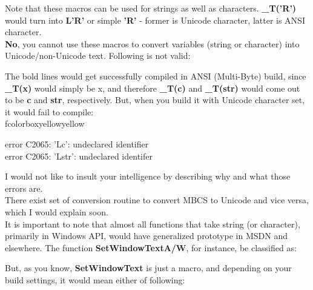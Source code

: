 	Note that these macros can be used for strings as well as characters. \textbf{\_T('R')} would turn into \textbf{L'R'} or simple \textbf{'R'} - former is Unicode character, latter is ANSI character.\\
	
	\textbf{No}, you cannot use these macros to convert variables (string or character) into Unicode/non-Unicode text. Following is not valid:\\
	
	
	The bold lines would get successfully compiled in ANSI (Multi-Byte) build, since \textbf{\_T(x)} would simply be x, and therefore \textbf{\_T(c)} and \textbf{\_T(str)} would come out to be \textbf{c} and \textbf{str}, respectively. But, when you build it with Unicode character set, it would fail to compile:\\
	
	fcolorbox{yellow}{yellow}{\parbox{0.9\linewidth}{error C2065: 'Lc': undeclared identifier\\ error C2065: 'Lstr': undeclared identifer}}
	
	I would not like to insult your intelligence by describing why and what those errors are.\\
	
	There exist set of conversion routine to convert MBCS to Unicode and vice versa, which I would explain soon.\\
	
	It is important to note that almost all functions that take string (or character), primarily in Windows API, would have generalized prototype in MSDN and elsewhere. The function \textbf{SetWindowTextA/W}, for instance, be classified as:\\
	
	
	
	But, as you know, \textbf{SetWindowText} is just a macro, and depending on your build settings, it would mean either of following:\\
	
	
